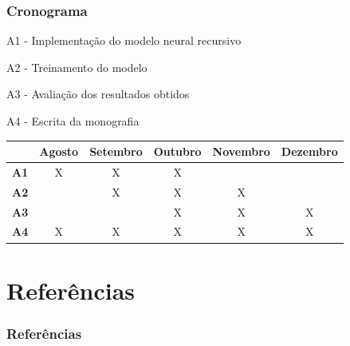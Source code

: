 \documentclass[10pt]{beamer}
\begin{document}
\begin{frame}[fragile]
  \frametitle{Cronograma}

  A1 - Implementação do modelo neural recursivo

  A2 - Treinamento do modelo

  A3 - Avaliação dos resultados obtidos

  A4 - Escrita da monografia

  \begin{table}[!htb]
  \footnotesize
  \centering
  \begin{tabular}{cccccc}
    \toprule
    & \textbf{Agosto} & \textbf{Setembro}  & \textbf{Outubro}  & \textbf{Novembro} & \textbf{Dezembro}  \\
    \midrule
    \textbf{A1} & X & X & X &   &   \\
    \textbf{A2} &   & X & X & X &   \\
    \textbf{A3} &   &   & X & X & X \\
    \textbf{A4} & X & X & X & X & X \\
    \bottomrule
  \end{tabular}
  \end{table}



\end{frame}



\section{Referências}

\begin{frame}

  \frametitle{Referências}
  

\end{frame}




\end{document}
